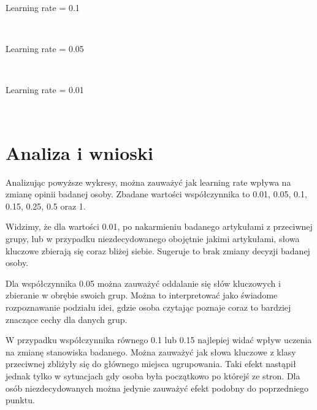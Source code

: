 \documentclass[11pt]{article}
\begin{document}
    \newpage
    Learning rate = 0.1

    \begin{center}
    \end{center}
    { \hspace*{\fill} \\}

    \newpage
    Learning rate = 0.05

    \begin{center}
    \end{center}
    { \hspace*{\fill} \\}

    \newpage
    Learning rate = 0.01

    \begin{center}
    \end{center}
    { \hspace*{\fill} \\}
    \newpage

    \section*{Analiza i wnioski}

    Analizując powyższe wykresy, można zauważyć jak learning rate wpływa na zmianę opinii badanej osoby. Zbadane wartości współczynnika to 0.01, 0.05, 0.1, 0.15, 0.25, 0.5 oraz 1. 

Widzimy, że dla wartości 0.01, po nakarmieniu badanego artykułami z przeciwnej grupy, lub w przypadku niezdecydowanego obojętnie jakimi artykułami, słowa kluczowe zbierają się coraz bliżej siebie. Sugeruje to brak zmiany decyzji badanej osoby. 

Dla współczynnika 0.05 można zauważyć oddalanie się słów kluczowych i zbieranie w obrębie swoich grup. Można to interpretować jako świadome rozpoznawanie podziału idei, gdzie osoba czytając poznaje coraz to bardziej znaczące cechy dla danych grup.

W przypadku współczynnika równego 0.1 lub 0.15 najlepiej widać wpływ uczenia na zmianę stanowiska badanego. Można zauważyć jak słowa kluczowe z klasy przeciwnej zbliżyły się do głównego miejsca ugrupowania. Taki efekt nastąpił jednak tylko w sytuacjach gdy osoba była początkowo po którejś ze stron. Dla osób niezdecydowanych można jedynie zauważyć efekt podobny do poprzedniego punktu.
\end{document}
